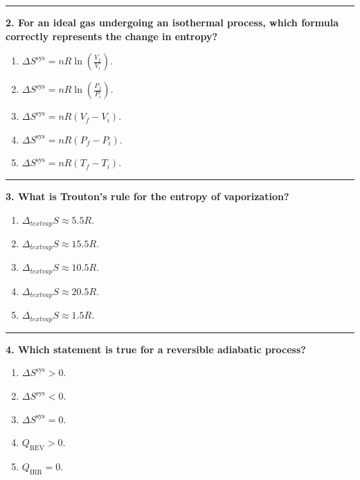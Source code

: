 \documentclass[
  9pt,
]{extbook}
\providecommand{\tightlist}{%
  \setlength{\itemsep}{0pt}\setlength{\parskip}{0pt}}
\theoremstyle{definition}
\theoremstyle{definition}
\theoremstyle{definition}
\theoremstyle{remark}
\begin{document}
\begin{center}\rule{0.5\linewidth}{0.5pt}\end{center}

\textbf{2. For an ideal gas undergoing an isothermal process, which formula correctly represents the change in entropy?}

\begin{enumerate}
\def\labelenumi{\alph{enumi}.}
\tightlist
\item
  \(\Delta S^{\text{sys}} = nR \ln \left(\frac{V_f}{V_i}\right)\).
\item
  \(\Delta S^{\text{sys}} = nR \ln \left(\frac{P_f}{P_i}\right)\).
\item
  \(\Delta S^{\text{sys}} = nR (V_f - V_i)\).
\item
  \(\Delta S^{\text{sys}} = nR (P_f - P_i)\).
\item
  \(\Delta S^{\text{sys}} = nR (T_f - T_i)\).
\end{enumerate}

\begin{center}\rule{0.5\linewidth}{0.5pt}\end{center}

\textbf{3. What is Trouton's rule for the entropy of vaporization?}

\begin{enumerate}
\def\labelenumi{\alph{enumi}.}
\tightlist
\item
  \(\Delta_{text{vap}} S \approx 5.5R\).
\item
  \(\Delta_{text{vap}} S \approx 15.5R\).
\item
  \(\Delta_{text{vap}} S \approx 10.5R\).
\item
  \(\Delta_{text{vap}} S \approx 20.5R\).
\item
  \(\Delta_{text{vap}} S \approx 1.5R\).
\end{enumerate}

\begin{center}\rule{0.5\linewidth}{0.5pt}\end{center}

\textbf{4. Which statement is true for a reversible adiabatic process?}

\begin{enumerate}
\def\labelenumi{\alph{enumi}.}
\tightlist
\item
  \(\Delta S^{\text{sys}} > 0\).
\item
  \(\Delta S^{\text{sys}} < 0\).
\item
  \(\Delta S^{\text{sys}} = 0\).
\item
  \(Q_{\text{REV}} > 0\).
\item
  \(Q_{\text{IRR}} = 0\).
\end{enumerate}
\end{document}
